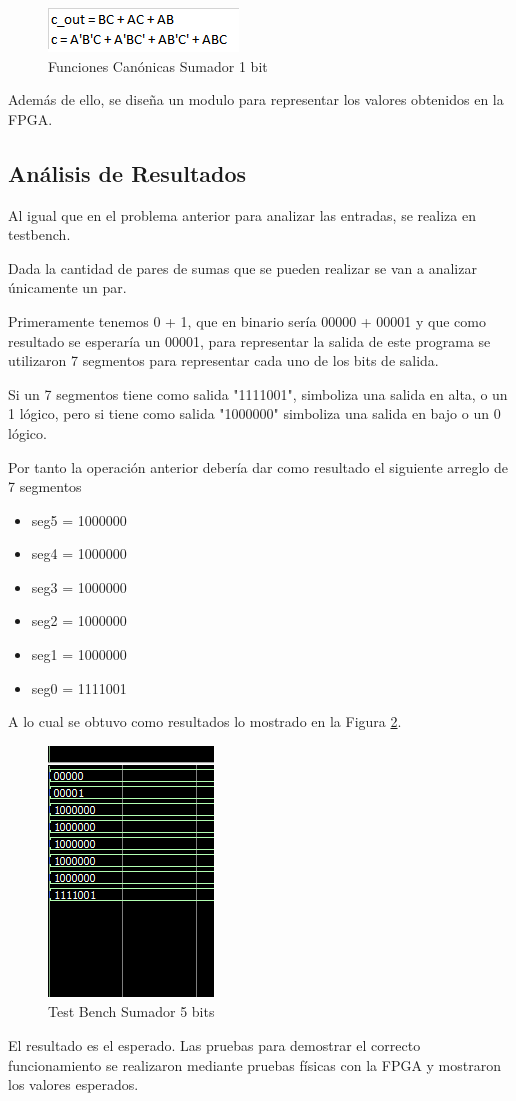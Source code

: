 \documentclass[journal]{IEEEtran}
\begin{document}
	\begin{figure}[htb]
		\centering
		\includegraphics[scale = 0.8]{img/p2/fc6.png}
		\caption{Funciones Canónicas Sumador 1 bit}
		\label{fig:suma6fc}
	\end{figure}
	
	Además de ello, se diseña un modulo para representar los valores obtenidos en la FPGA. 
	\subsection{Análisis de Resultados}
	Al igual que en el problema anterior para analizar las entradas, se realiza en testbench. 
	
	Dada la cantidad de pares de sumas que se pueden realizar se van a analizar únicamente un par. 
	
	Primeramente tenemos 0 + 1, que en binario sería 00000 + 00001 y que como resultado se esperaría un 00001, para representar la salida de este programa se utilizaron 7 segmentos para representar cada uno de los bits de salida. 
	
	Si un 7 segmentos tiene como salida "1111001", simboliza una salida en alta, o un 1 lógico, pero si tiene como salida "1000000" simboliza una salida en bajo o un 0 lógico.  
	
	Por tanto la operación anterior debería dar como resultado el siguiente arreglo de 7 segmentos
	\begin{itemize}
		\item seg5 = 1000000
		\item seg4 = 1000000
		\item seg3 = 1000000
		\item seg2 = 1000000
		\item seg1 = 1000000
		\item seg0 = 1111001
	\end{itemize}
	A lo cual se obtuvo como resultados lo mostrado en la Figura \ref{fig:tbSum1}.
	
	\begin{figure}[htb]
		\centering
		\includegraphics[scale = 0.8]{img/p2/tbS1.png}
		\caption{Test Bench Sumador 5 bits}
		\label{fig:tbSum1}
	\end{figure}
	El resultado es el esperado. 
	Las pruebas para demostrar el correcto funcionamiento se realizaron mediante pruebas físicas con la FPGA y mostraron los valores esperados. 
	
\end{document}
